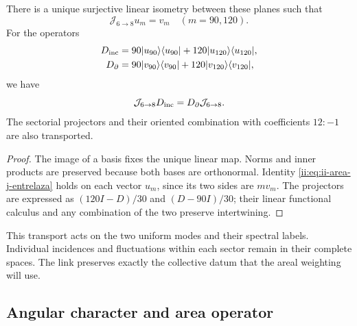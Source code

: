 \begin{theorem}
\label{ii:thm:ii-area-entrelazamiento-colectivo}
There is a unique surjective linear isometry between these planes such that
\begin{equation}
 \mathcal J_{6\to8}u_m=v_m\quad(m=90,120).
 \label{ii:eq:ii-area-j-colectivo}
\end{equation}
For the operators
\[
 \begin{aligned}
 D_{\rm inc}&=90|u_{90}\rangle\langle u_{90}|
             +120|u_{120}\rangle\langle u_{120}|,\\
 D_\partial&=90|v_{90}\rangle\langle v_{90}|
             +120|v_{120}\rangle\langle v_{120}|,
 \end{aligned}
\]
we have
\begin{equation}
 \mathcal J_{6\to8}D_{\rm inc}
 =D_\partial\mathcal J_{6\to8}.
 \label{ii:eq:ii-area-j-entrelaza}
\end{equation}
The sectorial projectors and their oriented combination with
coefficients \(12:-1\) are also transported.
\end{theorem}
\begin{proof}
The image of a basis fixes the unique linear map. Norms and
inner products are preserved because both bases are orthonormal.
Identity \eqref{ii:eq:ii-area-j-entrelaza} holds on each vector
\(u_m\), since its two sides are \(m v_m\). The projectors are
expressed as \((120I-D)/30\) and \((D-90I)/30\); their linear functional
calculus and any combination of the two preserve intertwining.
\end{proof}

This transport acts on the two uniform modes and their spectral
labels. Individual incidences and fluctuations within
each sector remain in their complete spaces. The link preserves
exactly the collective datum that the areal weighting will use.

\subsection{Angular character and area operator}
\label{ii:sec:ii-area-caracter}

